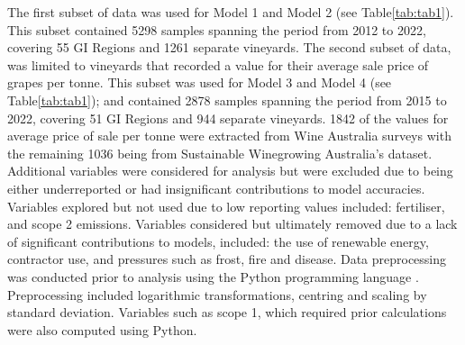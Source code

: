 \documentclass[review,12pt,authoryear]{elsarticle}
\begin{document}
\begin{linenumbers}
\newline
The first subset of data was used for Model 1 and Model 2 (see Table\ref{tab:tab1}). This subset contained 5298 samples spanning the period from 2012 to 2022, covering 55 GI Regions and 1261 separate vineyards.
\newline
The second subset of data, was limited to vineyards that recorded a value for their average sale price of grapes per tonne. This subset was used for Model 3 and Model 4 (see Table\ref{tab:tab1}); and contained 2878 samples spanning the period from 2015 to 2022, covering 51 GI Regions and 944 separate vineyards. 1842 of the values for average price of sale per tonne were extracted from Wine Australia surveys with the remaining 1036 being from Sustainable Winegrowing Australia's dataset.
\newline
Additional variables were considered for analysis but were excluded due to being either underreported or had insignificant contributions to model accuracies. Variables explored but not used due to low reporting values included: fertiliser, and scope 2 emissions. Variables considered but ultimately removed due to a lack of significant contributions to models, included: the use of renewable energy, contractor use, and pressures such as frost, fire and disease.
\newline
Data preprocessing was conducted prior to analysis using the Python programming language \citep{g.vanrossumPythonTutorialTechnical1995}. Preprocessing included logarithmic transformations, centring and scaling by standard deviation. Variables such as scope 1, which required prior calculations were also computed using Python.

\end{linenumbers}
\end{document}
